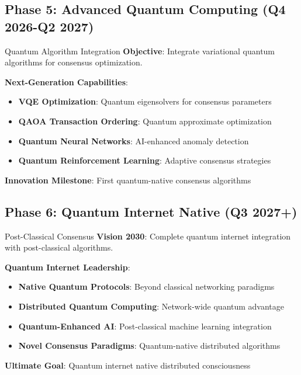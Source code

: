 \documentclass[11pt,a4paper]{article}
\begin{document}
\subsection{Phase 5: Advanced Quantum Computing (Q4 2026-Q2 2027)}

\begin{phasebox}{Quantum Algorithm Integration}
\textbf{Objective}: Integrate variational quantum algorithms for consensus optimization.

\textbf{Next-Generation Capabilities}:
\begin{itemize}
\item \textbf{VQE Optimization}: Quantum eigensolvers for consensus parameters
\item \textbf{QAOA Transaction Ordering}: Quantum approximate optimization
\item \textbf{Quantum Neural Networks}: AI-enhanced anomaly detection
\item \textbf{Quantum Reinforcement Learning}: Adaptive consensus strategies
\end{itemize}

\textbf{Innovation Milestone}: First quantum-native consensus algorithms
\end{phasebox}

\subsection{Phase 6: Quantum Internet Native (Q3 2027+)}

\begin{phasebox}{Post-Classical Consensus}
\textbf{Vision 2030}: Complete quantum internet integration with post-classical algorithms.

\textbf{Quantum Internet Leadership}:
\begin{itemize}
\item \textbf{Native Quantum Protocols}: Beyond classical networking paradigms
\item \textbf{Distributed Quantum Computing}: Network-wide quantum advantage
\item \textbf{Quantum-Enhanced AI}: Post-classical machine learning integration
\item \textbf{Novel Consensus Paradigms}: Quantum-native distributed algorithms
\end{itemize}

\textbf{Ultimate Goal}: Quantum internet native distributed consciousness
\end{phasebox}
\end{document}
